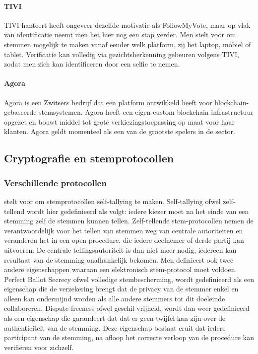 				\paragraph{TIVI}
					TIVI hanteert heeft ongeveer dezelfde motivatie als FollowMyVote, maar op vlak van identificatie neemt men het hier nog een stap verder. Men stelt voor om stemmen mogelijk te maken vanaf eender welk platform, zij het laptop, mobiel of tablet. Verificatie kan volledig via gezichtsherkenning gebeuren volgens TIVI, zodat men zich kan identificeren door een selfie te nemen.
				\paragraph{Agora}
					Agora is een Zwitsers bedrijf dat een platform ontwikkeld heeft voor blockchain-gebaseerde stemsystemen. Agora heeft een eigen custom blockchain infrastructuur opgezet en bouwt middel tot grote verkiezingstoepassing op maat voor haar klanten. Agora geldt momenteel als een van de grootste spelers in de sector.
					
	\subsection{Cryptografie en stemprotocollen}
		\subsubsection{Verschillende protocollen}
		\textcite{Kiayias2002} stelt voor om stemprotocollen self-tallying te maken. Self-tallying ofwel zelf-tellend wordt hier gedefinieerd als volgt: iedere kiezer moet na het einde van een stemming zelf de stemmen kunnen tellen. Zelf-tellende stem-protocollen nemen de verantwoordelijk voor het tellen van stemmen weg van centrale autoriteiten en veranderen het in een open procedure, die iedere deelnemer of derde partij kan uitvoeren. De centrale tellingsautoriteit is dan niet meer nodig, iedereen kan resultaat van de stemming onafhankelijk bekomen. Men definieert ook twee andere eigenschappen waaraan een elektronisch stem-protocol moet voldoen.  Perfect Ballot Secrecy ofwel volledige stembescherming, wordt gedefinieerd als een eigenschap die de verzekering brengt dat de privacy van de stemmer enkel en alleen kan ondermijnd worden als alle andere stemmers tot dit doeleinde collaboreren. Dispute-freeness ofwel geschil-vrijheid, wordt dan weer gedefinieerd als een eigenschap die garandeert dat dat er geen twijfel kan zijn over de authenticiteit van de stemming. Deze eigenschap bestaat eruit dat iedere participant van de stemming, na afloop het correcte verloop van de procedure kan verifiëren voor zichzelf.
			
